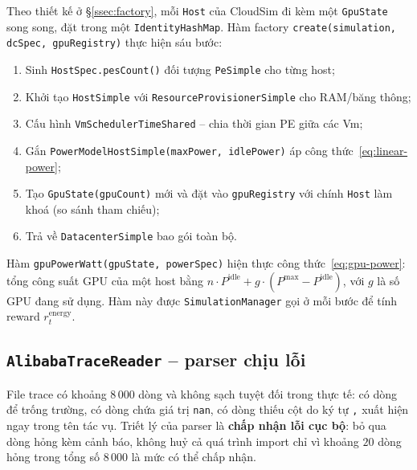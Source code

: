 Theo thiết kế ở §\ref{ssec:factory}, mỗi \texttt{Host} của CloudSim đi
kèm một \texttt{GpuState} song song, đặt trong một
\texttt{IdentityHashMap}. Hàm factory
\texttt{create(simulation, dcSpec, gpuRegistry)} thực hiện sáu bước:

\begin{enumerate}
  \item Sinh \texttt{HostSpec.pesCount()} đối tượng \texttt{PeSimple} cho
        từng host;
  \item Khởi tạo \texttt{HostSimple} với
        \texttt{ResourceProvisionerSimple} cho RAM/băng thông;
  \item Cấu hình \texttt{VmSchedulerTimeShared} -- chia thời gian PE giữa
        các Vm;
  \item Gắn \texttt{PowerModelHostSimple(maxPower, idlePower)} áp công
        thức~\eqref{eq:linear-power};
  \item Tạo \texttt{GpuState(gpuCount)} mới và đặt vào \texttt{gpuRegistry}
        với chính \texttt{Host} làm khoá (so sánh tham chiếu);
  \item Trả về \texttt{DatacenterSimple} bao gói toàn bộ.
\end{enumerate}

Hàm \texttt{gpuPowerWatt(gpuState, powerSpec)} hiện thực
công thức~\eqref{eq:gpu-power}: tổng công suất GPU của một host bằng
$n \cdot P^{\mathrm{idle}} + g \cdot (P^{\mathrm{max}} - P^{\mathrm{idle}})$,
với $g$ là số GPU đang sử dụng. Hàm này được
\texttt{SimulationManager} gọi ở mỗi bước để tính reward
$r^{\mathrm{energy}}_t$.

\subsection{\texttt{AlibabaTraceReader} -- parser chịu lỗi}
\label{ssec:impl-trace}

File trace có khoảng $8\,000$ dòng và không sạch tuyệt đối trong thực
tế: có dòng để trống trường, có dòng chứa giá trị \texttt{nan}, có
dòng thiếu cột do ký tự \texttt{,} xuất hiện ngay trong tên tác vụ.
Triết lý của parser là \textbf{chấp nhận lỗi cục bộ}: bỏ qua dòng hỏng
kèm cảnh báo, không huỷ cả quá trình import chỉ vì khoảng $20$ dòng
hỏng trong tổng số $8\,000$ là mức có thể chấp nhận.

